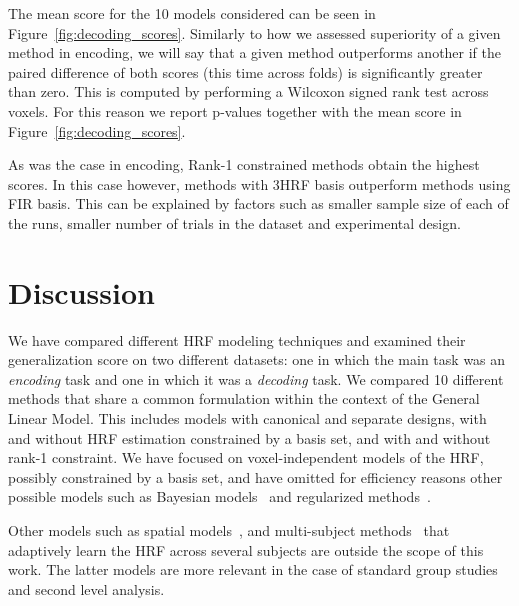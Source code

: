 The mean score for the 10 models considered can be seen in
Figure~\ref{fig:decoding_scores}. Similarly to how we assessed superiority of
a given method in encoding, we will say that a given method outperforms
another if the paired difference of both scores (this time across folds) is
significantly greater than zero. This is computed by performing a Wilcoxon
signed rank test across voxels. For this reason we report p-values
together with the mean score in Figure~\ref{fig:decoding_scores}.

As was the case in encoding, Rank-1 constrained methods obtain the highest
scores. In this case however, methods with 3HRF basis outperform methods using
FIR basis. This can be explained by factors such as smaller sample size of
each of the runs, smaller number of trials in the dataset and experimental design.




\section{Discussion}

We have compared different HRF modeling techniques and examined their
generalization score on two different datasets: one in which the main task was
an \emph{encoding} task and one in which it was a \emph{decoding} task. We
compared 10 different methods that share a common formulation within the
context of the General Linear Model. This includes models with canonical and
separate designs, with and without HRF estimation constrained by a basis set,
and with and without rank-1 constraint. We have focused on voxel-independent
models of the HRF, possibly constrained by a basis set, and have omitted for
efficiency reasons other possible models such as Bayesian
models~\citep{marrelec2003robust,Ciuciu2003,Makni2005} and regularized
methods~\citep{Goutte2000,Casanova2008}.

Other models such as spatial models~\citep{vincent2010spatially}, and 
\mbox{multi-subject}
methods~\citep{Zhang2012,Zhang2013} that adaptively learn the HRF
across several subjects are outside the scope of this work.  The latter models
are more relevant in the case of standard group studies and second level
analysis.

